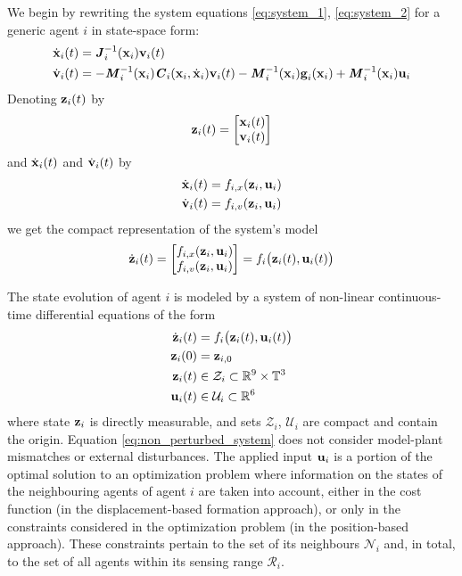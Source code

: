 We begin by rewriting the system equations \eqref{eq:system_1},
\eqref{eq:system_2} for a generic agent $i$ in state-space form:
\begin{align}
  \dot{\bm{\mathbf{x}}}_i(t) &= \bm{\mathit{J}}_i^{-1}(\bm{\mathbf{x}}_i) \bm{\mathbf{v}}_i(t) \\
  \dot{\bm{\mathbf{v}}}_i(t) &= -\bm{\mathit{M}}_i^{-1}(\bm{\mathbf{x}}_i)\bm{\mathit{C}}_i(\bm{\mathbf{x}}_i,\dot{\bm{\mathbf{x}}}_i) \bm{\mathbf{v}}_i(t)
    - \bm{\mathit{M}}_i^{-1}(\bm{\mathbf{x}}_i)\bm{\mathbf{g}}_i(\bm{\mathbf{x}}_i)
    + \bm{\mathit{M}}_i^{-1}(\bm{\mathbf{x}}_i)\bm{\mathbf{u}}_i
\label{eq:system}
\end{align}
Denoting $\bm{\mathbf{z}}_i(t)$ by
\begin{align}
  \bm{\mathbf{z}}_i(t) =
    \begin{bmatrix}
      \bm{\mathbf{x}}_i(t) \\
      \bm{\mathbf{v}}_i(t) \\
    \end{bmatrix}
\end{align}
and
$\dot{\bm{\mathbf{x}}}_i(t)$ and $\dot{\bm{\mathbf{v}}}_i(t)$ by
\begin{align}
  \dot{\bm{\mathbf{x}}}_i(t) &= f_{i,x}(\bm{\mathbf{z}}_i, \bm{\mathbf{u}}_i) \\
  \dot{\bm{\mathbf{v}}}_i(t) &= f_{i,v}(\bm{\mathbf{z}}_i, \bm{\mathbf{u}}_i)
\end{align}
we get the compact representation of the system's model
\begin{align}
  \dot{\bm{\mathbf{z}}}_i(t) =
    \begin{bmatrix}
      f_{i,x}(\bm{\mathbf{z}}_i, \bm{\mathbf{u}}_i) \\
      f_{i,v}(\bm{\mathbf{z}}_i, \bm{\mathbf{u}}_i) \\
    \end{bmatrix} =
 f_i \big(\bm{\mathbf{z}}_i (t), \bm{\mathbf{u}}_i (t)\big)
\end{align}

The state evolution of agent $i$ is modeled by a system of non-linear
continuous-time differential equations of the form
\begin{align}
  \dot{\bm{\mathbf{z}}}_i(t) &= f_i \big(\bm{\mathbf{z}}_i (t), \bm{\mathbf{u}}_i (t)\big) \label{eq:non_perturbed_system}\\
  \bm{\mathbf{z}}_i(0) &= \bm{\mathbf{z}}_{i,0} \\
  \bm{\mathbf{z}}_i (t) &\in \mathcal{Z}_i \subset \mathbb{R}^{9} \times \mathbb{T}^3 \\
  \bm{\mathbf{u}}_i (t) &\in \mathcal{U}_i \subset \mathbb{R}^6
\end{align}
where state $\bm{\mathbf{z}}_i$ is directly measurable, and sets $\mathcal{Z}_i$,
$\mathcal{U}_i$ are compact and contain the origin. Equation
\ref{eq:non_perturbed_system} does not consider model-plant mismatches or
external disturbances. The applied input $\bm{\mathbf{u}}_i$ is a portion of the
optimal solution to an optimization problem where information on the states
of the neighbouring agents of agent $i$ are taken into account, either in the
cost function (in the displacement-based formation approach), or only in the
constraints considered in the optimization problem (in the position-based
approach). These constraints pertain to the set of its neighbours
$\mathcal{N}_i$ and, in total, to the set of all agents within its sensing
range $\mathcal{R}_i$.

